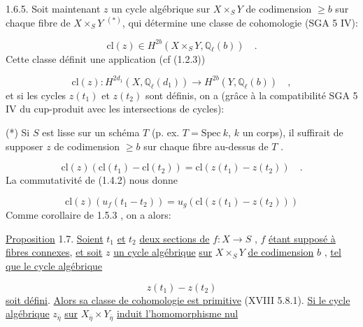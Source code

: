 1.6.5. Soit maintenant $z$ un cycle algébrique sur $X \times_S Y$ de codimension $\geq b$ sur chaque fibre de $X \times_S Y$ $^{(*)}$, qui détermine une classe de cohomologie (SGA 5 IV\hspace{2em}):

\begin{equation}\tag{1.6.6}
\mathrm{cl}(z) \in H^{2b}(X \times_S Y, \mathbb{Q}_\ell(b)) \quad .
\end{equation}
Cette classe définit une application (cf (1.2.3))

\begin{equation}\tag{1.6.7}
\mathrm{cl}(z) : H^{2d_1}(X, \mathbb{Q}_\ell(d_1)) \longrightarrow H^{2b}(Y, \mathbb{Q}_\ell(b)) \quad ,
\end{equation}
et si les cycles $z(t_1)$ et $z(t_2)$ sont définis, on a (grâce à la compatibilité SGA 5 IV\hspace{3em} du cup-produit avec les intersections de cycles):

(*) Si $S$ est lisse sur un schéma $T$ (p. ex. $T=\mathrm{Spec}\ k$, $k$ un corps), il suffirait de supposer $z$ de codimension $\geq b$ sur chaque fibre au-dessus de $T$ .



\begin{equation}\tag{1.6.8}
\mathrm{cl}(z) (\mathrm{cl}(t_1) - \mathrm{cl}(t_2)) = \mathrm{cl}(z(t_1) - z(t_2)) \quad .
\end{equation}
La commutativité de (1.4.2) nous donne

\begin{equation}\tag{1.6.9}
\mathrm{cl}(z) (u_f(t_1-t_2)) = u_g(\mathrm{cl}(z(t_1) - z(t_2)))
\end{equation}
Comme corollaire de 1.5.3 , on a alors:

\underline{Proposition} 1.7. \underline{Soient} $t_1$ \underline{et} $t_2$ \underline{deux sections de} $f : X \longrightarrow S$ , $f$ \underline{étant supposé à fibres connexes}, \underline{et soit} $z$ \underline{un cycle algébrique} \underline{sur} $X \times_S Y$ \underline{de codimension} $b$ , \underline{tel que le cycle algébrique}

\begin{equation}\tag{1.7.1}
z(t_1) - z(t_2)
\end{equation}
\underline{soit défini}. \underline{Alors sa classe de cohomologie est primitive} (XVIII 5.8.1). \underline{Si le cycle algébrique} $z_{\overline{\eta}}$ \underline{sur} $X_{\overline{\eta}} \times Y_{\overline{\eta}}$ \underline{induit l'homomorphisme nul}

